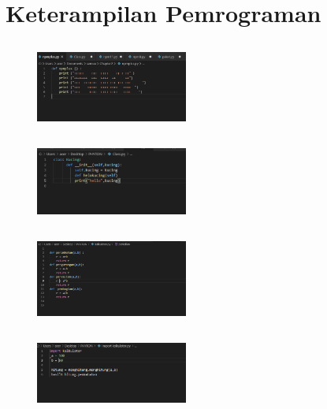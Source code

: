 \documentclass{article}
\begin{document}
\newpage\section{Keterampilan Pemrograman}
\subsection{}
\begin{figure}[h]
\centerline{\includegraphics[width=5cm]{figure/1.PNG}}
\end{figure}
\subsection{}
\begin{figure}[h]
\centerline{\includegraphics[width=5cm]{figure/A.PNG}}
\end{figure}
\subsection{}
\begin{figure}[h]
\centerline{\includegraphics[width=5cm]{figure/B.PNG}}
\end{figure}
\newpage\subsection{}
\begin{figure}[h]
\centerline{\includegraphics[width=5cm]{figure/C.PNG}}
\end{figure}
\end{document}
